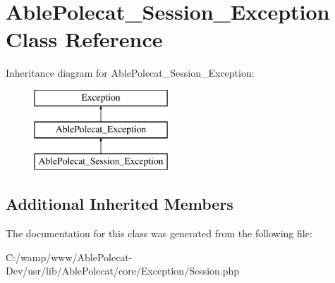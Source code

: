 \hypertarget{class_able_polecat___session___exception}{}\section{Able\+Polecat\+\_\+\+Session\+\_\+\+Exception Class Reference}
\label{class_able_polecat___session___exception}
Inheritance diagram for Able\+Polecat\+\_\+\+Session\+\_\+\+Exception\+:\begin{figure}[H]
\begin{center}
\leavevmode
\includegraphics[height=3.000000cm]{class_able_polecat___session___exception}
\end{center}
\end{figure}
\subsection*{Additional Inherited Members}


The documentation for this class was generated from the following file\+:\begin{DoxyCompactItemize}
\item 
C\+:/wamp/www/\+Able\+Polecat-\/\+Dev/usr/lib/\+Able\+Polecat/core/\+Exception/Session.\+php\end{DoxyCompactItemize}

